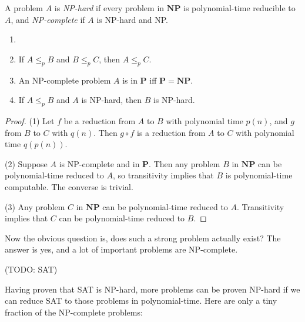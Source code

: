     \begin{defn}[NP-complete] \label{def_npc}
        A problem $A$ is \emph{NP-hard} if every problem in $\mathbf{NP}$ is polynomial-time reducible to $A$, and \emph{NP-complete} if $A$ is NP-hard and NP.
    \end{defn}
        
    \begin{thm} \label{thm_leqp_transitive}
        \begin{enumerate}
            \item[]
            \item If $A \leq_p B$ and $B \leq_p C$, then $A \leq_p C$.
            \item An NP-complete problem $A$ is in $\mathbf{P}$ iff $\mathbf{P}=\mathbf{NP}$.
            \item If $A \leq_p B$ and $A$ is NP-hard, then $B$ is NP-hard.
        \end{enumerate}
    \end{thm}
        
    \begin{proof}
        (1) Let $f$ be a reduction from $A$ to $B$ with polynomial time $p(n)$, and $g$ from $B$ to $C$ with $q(n)$. Then $g \circ f$ is a reduction from $A$ to $C$ with polynomial time $q(p(n))$.
            
        (2) Suppose $A$ is NP-complete and in $\mathbf{P}$. Then any problem $B$ in $\mathbf{NP}$ can be polynomial-time reduced to $A$, so transitivity implies that $B$ is polynomial-time computable. The converse is trivial.
            
        (3) Any problem $C$ in $\mathbf{NP}$ can be polynomial-time reduced to $A$. Transitivity implies that $C$ can be polynomial-time reduced to $B$.
    \end{proof}
        
    Now the obvious question is, does such a strong problem actually exist? The answer is yes, and a lot of important problems are NP-complete.
        
    (TODO: SAT)
        
    Having proven that SAT is NP-hard, more problems can be proven NP-hard if we can reduce SAT to those problems in polynomial-time. Here are only a tiny fraction of the NP-complete problems:
        
